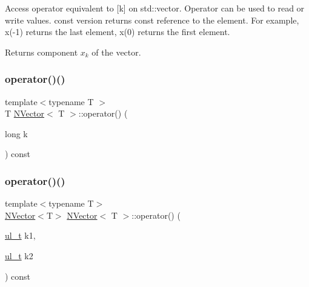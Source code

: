 Access operator equivalent to {\ttfamily \mbox{[}k\mbox{]}} on {\ttfamily std\+::vector}. Operator can be used to read or write values. {\ttfamily const} version returns {\ttfamily const} reference to the element. For example, {\ttfamily x(-\/1)} returns the last element, {\ttfamily x(0)} returns the first element. \begin{DoxyReturn}{Returns}
component $ x_{k} $ of the vector. 
\end{DoxyReturn}
\mbox{\label{class_n_vector_a51d4a2c505c1434f45e8f80d1d77eda5}} 
\subsubsection{\texorpdfstring{operator()()}{operator()()}\hspace{0.1cm}{\footnotesize\ttfamily [2/4]}}
{\footnotesize\ttfamily template$<$typename T $>$ \\
T \mbox{\hyperlink{class_n_vector}{N\+Vector}}$<$ T $>$\+::operator() (\begin{DoxyParamCaption}\item[{long}]{k }\end{DoxyParamCaption}) const}

\mbox{\label{class_n_vector_a8778fdc3c0a27a7930fda3f2a7155e96}} 
\subsubsection{\texorpdfstring{operator()()}{operator()()}\hspace{0.1cm}{\footnotesize\ttfamily [3/4]}}
{\footnotesize\ttfamily template$<$typename T$>$ \\
\mbox{\hyperlink{class_n_vector}{N\+Vector}}$<$T$>$ \mbox{\hyperlink{class_n_vector}{N\+Vector}}$<$ T $>$\+::operator() (\begin{DoxyParamCaption}\item[{\mbox{\hyperlink{typedef_8h_a1b140a2034db3f5dfe18a987745df43a}{ul\+\_\+t}}}]{k1,  }\item[{\mbox{\hyperlink{typedef_8h_a1b140a2034db3f5dfe18a987745df43a}{ul\+\_\+t}}}]{k2 }\end{DoxyParamCaption}) const\hspace{0.3cm}{\ttfamily [inline]}}



